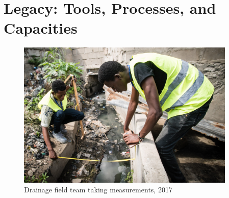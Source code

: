 \documentclass[a4paper,12pt,twoside]{article}
\begin{document}
\section{Legacy: Tools, Processes, and Capacities}
\begin{figure}[h!]
	\centering
	\includegraphics[width=\textwidth, height=7cm,keepaspectratio]{images/Drainage_fieldwork.JPG}
	\caption{Drainage field team taking measurements, 2017}
\end{figure}
\end{document}
